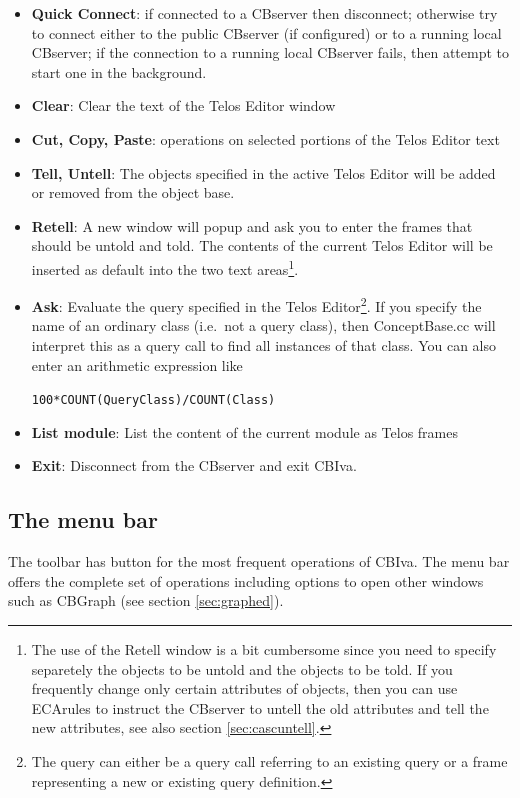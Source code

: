 \begin{itemize}
\item {\bf Quick Connect}: if connected to a CBserver then disconnect; otherwise try to
 connect either to the public CBserver (if configured) or to a running local CBserver; 
 if the connection to a running local CBserver fails, then attempt to start one in the background.
\item {\bf Clear}: Clear the text of the Telos Editor window
\item {\bf Cut, Copy, Paste}: operations on selected portions of the Telos Editor text
\item {\bf Tell, Untell}: The objects specified in the active Telos Editor will be added or removed
from the object base.
\item {\bf Retell}: A new window will popup and ask you to enter the frames that should be untold and
told. The contents of the current Telos Editor will be inserted as default into the two text areas\footnote{%
The use of the Retell window is a bit cumbersome since you need to specify separetely the objects to
be untold and the objects to be told. If you frequently change only certain attributes of objects,
then you can use ECArules to instruct the CBserver to untell the old attributes and tell the new
attributes, see also section \ref{sec:cascuntell}.}.
\item {\bf Ask}: Evaluate the query specified in the Telos Editor\footnote{The query can either be a query call
referring to an existing query
or a frame representing a new or existing query definition.}. If you specify the name of an ordinary class (i.e.\
not a query class), then ConceptBase.cc will interpret this as a query call to find all instances of that class.
You can also enter an arithmetic expression like\newline
  \centerline{{\tt 100*COUNT(QueryClass)/COUNT(Class)}}
\item {\bf List module}: List the content of the current module as Telos frames
\item {\bf Exit}: Disconnect from the CBserver and exit CBIva.
\end{itemize}



\subsection{The menu bar}
\label{sec:menubar}

The toolbar has button for the most frequent operations of CBIva. The menu bar offers the complete set
of operations including options to open other windows such as CBGraph (see section \ref{sec:graphed}).

